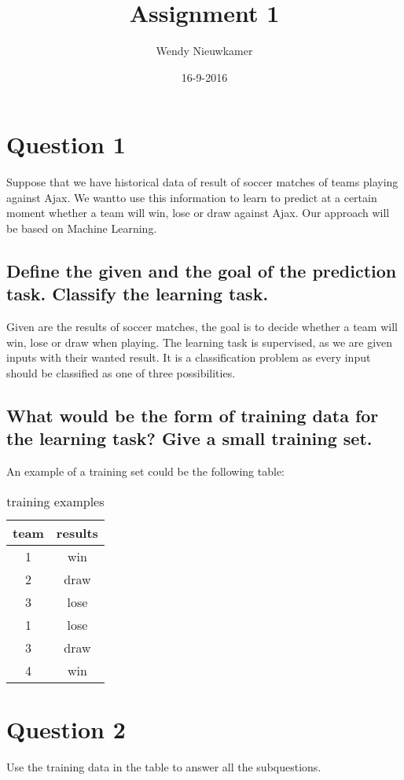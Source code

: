 \documentclass[12pt, a4paper]{article}
\title {Assignment 1}
\date{16-9-2016}
\author{Wendy Nieuwkamer}
\begin{document}
\maketitle

\section{Question 1}
Suppose that we have historical data of result of soccer matches of teams playing against Ajax. We wantto
use this information to learn to predict at a certain moment whether a team will win, lose or draw against
Ajax. Our approach will be based on Machine Learning.

\subsection{Define the given and the goal of the prediction task.
Classify the learning task.}

Given are the results of soccer matches, the goal is to decide whether a team will win, lose or draw when playing. 
The learning task is supervised, as we are given inputs with their wanted result. It is a classification problem as 
every input should be classified as one of three possibilities.


\subsection{What would be the form of training data for the learning task? Give a small training set.}
An example of a training set could be the following table:

\begin{table}
\centering
\begin{tabular}{c|c}
   team & results \\
   \hline
   1 & win\\
   2 & draw\\
   3 & lose\\
   1 & lose\\ 
   3 & draw\\
   4 & win\\
\end{tabular}
\caption{training examples}
\end{table}

\section{Question 2}
Use the training data in the table to answer all the subquestions. 
\end{document}
